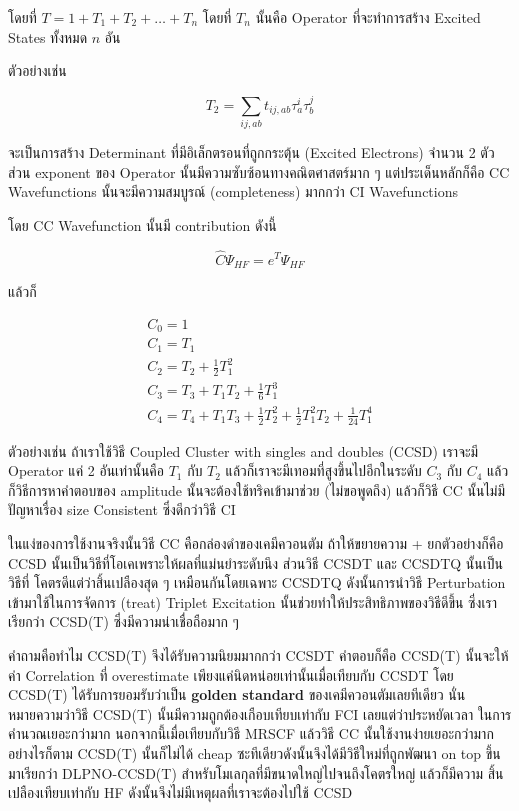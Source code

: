 \noindent โดยที่ $T = 1 + T_{1} + T_{2} + \dots + T_{n}$ โดยที่ $T_{n}$ นั้นคือ
Operator ที่จะทำการสร้าง Excited States ทั้งหมด $n$ อัน

ตัวอย่างเช่น

\begin{equation}
    T_{2} = \sum_{ij,ab} t_{ij,ab} \tau^{i}_{a} \tau^{j}_{b}
\end{equation}

จะเป็นการสร้าง Determinant ที่มีอิเล็กตรอนที่ถูกกระตุ้น (Excited Electrons) จำนวน 2 ตัว
ส่วน exponent ของ Operator นั้นมีความซับซ้อนทางคณิตศาสตร์มาก ๆ แต่ประเด็นหลักก็คือ
CC Wavefunctions นั้นจะมีความสมบูรณ์ (completeness) มากกว่า CI Wavefunctions

โดย CC Wavefunction นั้นมี contribution ดังนี้

\begin{equation}
    \hat{C} \Psi_{HF} = e^{T} \Psi_{HF}
\end{equation}

แล้วก็

\begin{gather}
    C_{0} = 1 \\
    C_{1} = T_{1} \\
    C_{2} = T_{2} + \frac{1}{2}T^{2}_{1} \\
    C_{3} = T_{3} + T_{1}T_{2} + \frac{1}{6}T^{3}_{1} \\
    C_{4} = T_{4} + T_{1}T_{3} + \frac{1}{2}T^{2}_{2}
    + \frac{1}{2}T^{2}_{1} T_{2} + \frac{1}{24}T^{4}_{1}
\end{gather}

ตัวอย่างเช่น ถ้าเราใช้วิธี Coupled Cluster with singles and doubles (CCSD) เราจะมี
Operator แค่ 2 อันเท่านั้นคือ $T_{1}$ กับ $T_{2}$ แล้วก็เราจะมีเทอมที่สูงขึ้นไปอีกในระดับ
$C_{3}$ กับ $C_{4}$ แล้วก็วิธีการหาคำตอบของ amplitude นั้นจะต้องใช้ทริคเข้ามาช่วย
(ไม่ขอพูดถึง) แล้วก็วิธี CC นั้นไม่มีปัญหาเรื่อง size Consistent ซึ่งดีกว่าวิธี CI

ในแง่ของการใช้งานจริงนั้นวิธี CC คือกล่องดำของเคมีควอนตัม ถ้าให้ขยายความ + ยกตัวอย่างก็คือ
CCSD นั้นเป็นวิธีที่โอเคเพราะให้ผลที่แม่นยำระดับนึง ส่วนวิธี CCSDT และ CCSDTQ นั้นเป็นวิธีที่%
โคตรดีแต่ว่าสิ้นเปลืองสุด ๆ เหมือนกันโดยเฉพาะ CCSDTQ ดังนั้นการนำวิธี Perturbation
เข้ามาใช้ในการจัดการ (treat) Triplet Excitation นั้นช่วยทำให้ประสิทธิภาพของวิธีดีขึ้น
ซึ่งเราเรียกว่า CCSD(T) ซึ่งมีความน่าเชื่อถือมาก ๆ

คำถามคือทำไม CCSD(T) จึงได้รับความนิยมมากกว่า CCSDT คำตอบก็คือ CCSD(T) นั้นจะให้ค่า
Correlation ที่ overestimate เพียงแค่นิดหน่อยเท่านั้นเมื่อเทียบกับ CCSDT โดย CCSD(T)
ได้รับการยอมรับว่าเป็น \textbf{golden standard} ของเคมีควอนตัมเลยทีเดียว
นั่นหมายความว่าวิธี CCSD(T) นั้นมีความถูกต้องเกือบเทียบเท่ากับ FCI เลยแต่ว่าประหยัดเวลา%
ในการคำนวณเยอะกว่ามาก นอกจากนี้เมื่อเทียบกับวิธี MRSCF แล้ววิธี CC นั้นใช้งานง่ายเยอะกว่ามาก
อย่างไรก็ตาม CCSD(T) นั้นก็ไม่ได้ cheap ซะทีเดียวดังนั้นจึงได้มีวิธีใหม่ที่ถูกพัฒนา on top
ขึ้นมาเรียกว่า DLPNO-CCSD(T) สำหรับโมเลกุลที่มีขนาดใหญ่ไปจนถึงโคตรใหญ่ แล้วก็มีความ%
สิ้นเปลืองเทียบเท่ากับ HF ดังนั้นจึงไม่มีเหตุผลที่เราจะต้องไปใช้ CCSD

